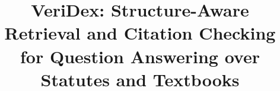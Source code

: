 \documentclass[conference]{IEEEtran}
\newif\ifshowdeployment \showdeploymenttrue  %
\begin{document}
\title{VeriDex: Structure-Aware Retrieval and Citation Checking for Question Answering over Statutes and Textbooks}

\author{
}

\maketitle







\ifshowdeployment\fi






\end{document}
